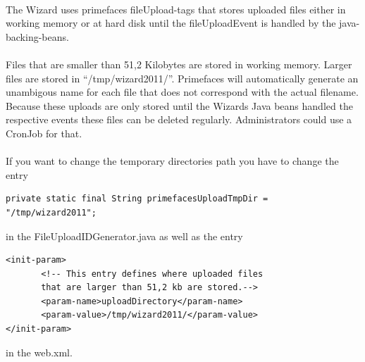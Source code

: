 \documentclass[a4paper,10pt]{book}
\begin{document}
\paragraph{} The Wizard uses primefaces fileUpload-tags that stores uploaded files either in working memory or at hard disk until the fileUploadEvent is handled by the java-backing-beans.
\paragraph{} Files that are smaller than 51,2 Kilobytes are stored in working memory. Larger files are stored in ``/tmp/wizard2011/''. Primefaces will automatically generate an unambigous name for each file that does not correspond with the actual filename. Because these uploads are only stored until the Wizards Java beans handled the respective events these files can be deleted regularly. Administrators could use a CronJob for that.
\paragraph{} If you want to change the temporary directories path you have to change the entry
\begin{verbatim}
private static final String primefacesUploadTmpDir = "/tmp/wizard2011";
\end{verbatim}
in the FileUploadIDGenerator.java as well as the entry
\begin{verbatim}
<init-param>
       <!-- This entry defines where uploaded files
       that are larger than 51,2 kb are stored.-->
       <param-name>uploadDirectory</param-name>
       <param-value>/tmp/wizard2011/</param-value>
</init-param>
\end{verbatim}
in the web.xml.
\end{document}
